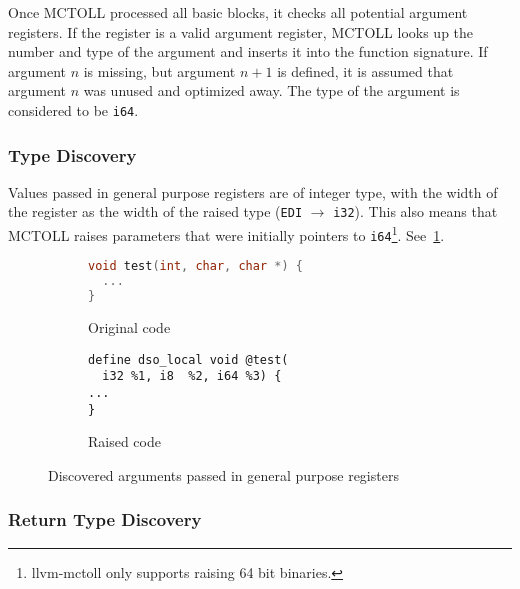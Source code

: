 Once MCTOLL processed all basic blocks, it checks all potential argument registers.
If the register is a valid argument register, MCTOLL looks up the number and type of the argument and inserts it into the function signature.
If argument $n$ is missing, but argument $n+1$ is defined, it is assumed that argument $n$ was unused and optimized away.
The type of the argument is considered to be \texttt{i64}.

\subsubsection{Type Discovery}\label{subsubsec:type-discovery}

Values passed in general purpose registers are of integer type, with the width of the register as the width of the raised type (\texttt{EDI} $\rightarrow$ \texttt{i32}).
This also means that MCTOLL raises parameters that were initially pointers to \texttt{i64}\footnote{llvm-mctoll only supports raising 64 bit binaries.}.
See~\cref{fig:raised-code-int-args}.

\begin{figure}[htpb]
    \centering
    \begin{subfigure}[t]{.45\textwidth}
        \begin{lstlisting}[language=C]
void test(int, char, char *) {
  ...
}
        \end{lstlisting}
        \caption{Original code}
    \end{subfigure}
    \begin{subfigure}[t]{.45\textwidth}
        \begin{lstlisting}
define dso_local void @test(
  i32 %1, i8  %2, i64 %3) {
...
}
        \end{lstlisting}
        \caption{Raised code}
    \end{subfigure}
    \caption{Discovered arguments passed in general purpose registers}
    \label{fig:raised-code-int-args}
\end{figure}

\subsubsection{Return Type Discovery}\label{subsubsec:return-type-discovery}

